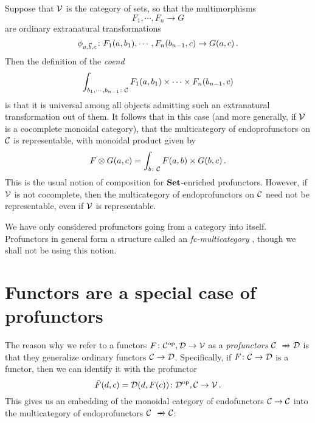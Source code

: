 Suppose that ${\mathcal{V}}$ is the category of sets, so that the multimorphisms
\[
  F_1,\cdots,F_n \to G
  \]
are ordinary extranatural transformations
\[
  \phi_{a,\vec{b},c} \colon F_1(a,b_1),\cdots,F_n(b_{n-1},c) \to G(a,c)\,.
  \]
Then the definition of the \emph{coend}
\[
  \int_{b_1,\cdots,b_{n-1}\colon{\mathcal{C}}} F_1(a,b_1)\times\cdots\times F_n(b_{n-1},c)
  \]
is that it is universal among all objects admitting such an extranatural transformation out of them.  
It follows that in this case (and more generally, if ${\mathcal{V}}$ is a cocomplete monoidal category), that the multicategory of endoprofunctors on ${\mathcal{C}}$ is representable, with monoidal product given by
\[
  F\otimes G(a, c) = \int_{b\colon {\mathcal{C}}} F(a,b) \times G(b,c)\,.
  \]
This is the usual notion of composition for ${\normalfont\textbf{Set}}$-enriched profunctors.  
However, if ${\mathcal{V}}$ is not cocomplete, then the multicategory of endoprofunctors on ${\mathcal{C}}$ need not be representable, even if ${\mathcal{V}}$ is representable.

We have only considered profunctors going from a category into itself.  
Profunctors in general form a structure called an \emph{fc-multicategory} \cite{Multicategories}, though we shall not be using this notion.

\section{Functors are a special case of profunctors}

The reason why we refer to a functors $F\colon {\mathcal{C}}^{\mathrm{op}},{\mathcal{D}} \to {\mathcal{V}}$ as a \emph{profunctors} $\C \pto \D$ is that they generalize ordinary functors ${\mathcal{C}} \to {\mathcal{D}}$.  
Specifically, if $F \colon {\mathcal{C}} \to {\mathcal{D}}$ is a functor, then we can identify it with the profunctor
\[
  \tilde{F}(d,c) = {\mathcal{D}}(d, F(c)) \colon {\mathcal{D}}^{\mathrm{op}}, {\mathcal{C}} \to {\mathcal{V}}\,.
  \]
This gives us an embedding of the monoidal category of endofunctors ${\mathcal{C}} \to {\mathcal{C}}$ into the multicategory of endoprofunctors $\C \pto \C$:

